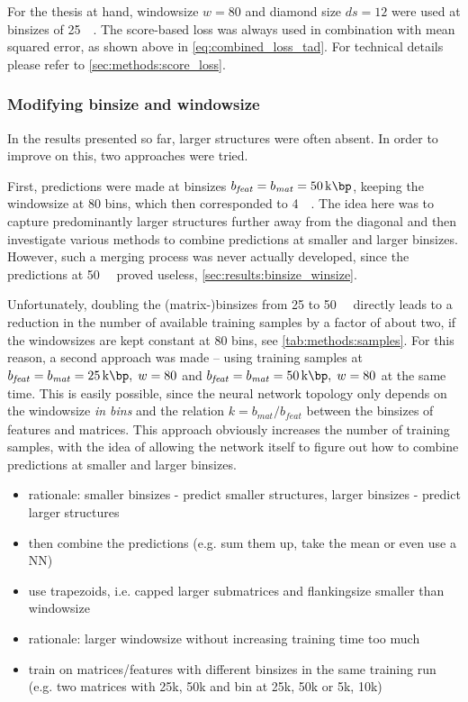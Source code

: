 For the thesis at hand, windowsize $w=80$ and diamond size $ds={12}$ were used at binsizes of \SI{25}{\kilo\bp}.
The score-based loss was always used in combination with mean squared error, as shown above in \cref{eq:combined_loss_tad}.
For technical details please refer to \cref{sec:methods:score_loss}.

\subsubsection{Modifying binsize and windowsize}
In the results presented so far, larger structures were often absent.
In order to improve on this, two approaches were tried.

First, predictions were made at binsizes $b_\mathit{feat} = b_\mathit{mat} = \SI{50}{\kilo\bp}$, 
keeping the windowsize at 80 bins, which then corresponded to \SI{4}{\mega\bp}.
The idea here was to capture predominantly larger structures further away from the diagonal and
then investigate various methods to combine predictions at smaller and larger binsizes.
However, such a merging process was never actually developed,
since the predictions at \SI{50}{\kilo\bp} proved useless, \cref{sec:results:binsize_winsize}.

Unfortunately, doubling the (matrix-)binsizes from 25 to \SI{50}{\kilo\bp} directly leads to a reduction in the number of available training samples by a factor of about two, 
if the windowsizes are kept constant at 80 bins, see \cref{tab:methods:samples}.
For this reason, a second approach was made -- using training samples at $b_\mathit{feat} = b_\mathit{mat} = \SI{25}{\kilo\bp},\;w=80$
and $b_\mathit{feat} = b_\mathit{mat} = \SI{50}{\kilo\bp},\;w=80$ at the same time.
This is easily possible, since the neural network topology only depends on the windowsize \emph{in bins} and the relation $k=b_\mathit{mat}/b_\mathit{feat}$
between the binsizes of features and matrices.
This approach obviously increases the number of training samples,
with the idea of allowing the network itself to figure out how to combine predictions at smaller and larger binsizes.


\begin{itemize}
 \item rationale: smaller binsizes - predict smaller structures, larger binsizes - predict larger structures
 \item then combine the predictions (e.g. sum them up, take the mean or even use a NN)
 \item use trapezoids, i.e. capped larger submatrices and flankingsize smaller than windowsize
 \item rationale: larger windowsize without increasing training time too much 
 \item train on matrices/features with different binsizes in the same training run (e.g. two matrices with 25k, 50k and bin at 25k, 50k or 5k, 10k)
 \end{itemize}

